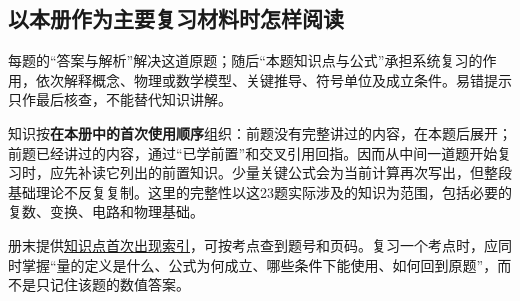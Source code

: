 \documentclass[a4paper]{report}
\begin{document}
\subsection*{以本册作为主要复习材料时怎样阅读}
每题的“答案与解析”解决这道原题；随后“本题知识点与公式”承担系统复习的作用，依次解释概念、物理或数学模型、关键推导、符号单位及成立条件。易错提示只作最后核查，不能替代知识讲解。

知识按\textbf{在本册中的首次使用顺序}组织：前题没有完整讲过的内容，在本题后展开；前题已经讲过的内容，通过“已学前置”和交叉引用回指。因而从中间一道题开始复习时，应先补读它列出的前置知识。少量关键公式会为当前计算再次写出，但整段基础理论不反复复制。这里的完整性以这23题实际涉及的知识为范围，包括必要的复数、变换、电路和物理基础。

册末提供\hyperref[hw:knowledge-index]{知识点首次出现索引}，可按考点查到题号和页码。复习一个考点时，应同时掌握“量的定义是什么、公式为何成立、哪些条件下能使用、如何回到原题”，而不是只记住该题的数值答案。

\setcounter{chapter}{1}





\end{document}
